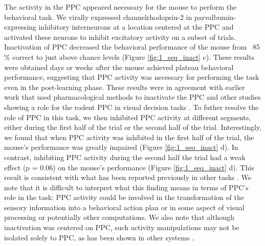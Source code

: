 The activity in the PPC appeared necessary for the mouse to perform the behavioral task. We virally expressed channelrhodopsin-2 in parvalbumin-expressing inhibitory interneurons at a location centered at the PPC and activated these neurons to inhibit excitatory activity on a subset of trials. Inactivation of PPC decreased the behavioral performance of the mouse from ~85 $\%$  correct to just above chance levels (Figure \ref{fig:1_seq_inact} c). These results were obtained days or weeks after the mouse achieved plateau behavioral performance, suggesting that PPC activity was necessary for performing the task even in the post-learning phase. These results were in agreement with earlier work that used pharmacological methods to inactivate the PPC and other studies showing a role for the rodent PPC in visual decision tasks \citep{Goard2016, Harvey:2012du, Licata2016, Raposo2014}. To futher resolve the role of PPC in this task, we then inhibited PPC activity at different segments, either during the first half of the trial or the second half of the trial. Interestingly, we found that when PPC activity was inhibited in the first half of the trial, the mouse's performance was greatly impaired (Figure \ref{fig:1_seq_inact} d). In contrast, inhibiting PPC activity during the second half the trial had a weak effect (p = 0.06) on the mouse's performance (Figure \ref{fig:1_seq_inact} d). This result is consistent with what has been reported previously in other tasks \citep{Goard2016, Licata2016, Raposo2014}. We note that it is difficult to interpret what this finding means in terms of PPC's role in the task: PPC activity could be involved in the transformation of the sensory information into a behavioral action plan or in some aspect of visual processing or potentially other computations. We also note that although inactivation was centered on PPC, such activity manipulations may not be isolated solely to PPC, as has been shown in other systems \citep{Otchy2015}.

